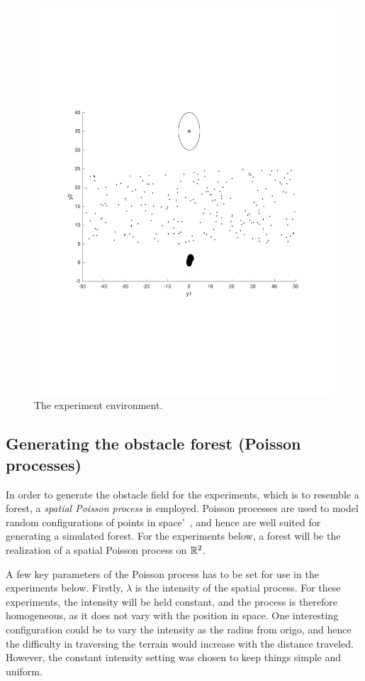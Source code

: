 \begin{figure}
  \centering \includegraphics[scale=.5]{figures/experiments/simulated-forest}
  \caption{The experiment environment.}
  \label{fig:simulated-forest}
\end{figure}

\subsection{Generating the obstacle forest (Poisson processes)}
\label{sec:Poisson-Process}

In order to generate the obstacle field for the experiments, which is to
resemble a forest, a \textit{spatial Poisson process} is employed. Poisson
processes are used to model random configurations of points in
space'~\cite{Kroese_2014}, and hence are well suited for generating a simulated
forest. For the experiments below, a forest will be the realization of a spatial
Poisson process on \(\mathbb{R}^2\).

A few key parameters of the Poisson process has to be set for use in the
experiments below. Firstly, \(\lambda\) is the intensity of the spatial process.
For these experiments, the intensity will be held constant, and the process is
therefore homogeneous, as it does not vary with the position in space. One
interesting configuration could be to vary the intensity as the radius from
origo, and hence the difficulty in traversing the terrain would increase with
the distance traveled. However, the constant intensity setting was chosen to
keep things simple and uniform.


